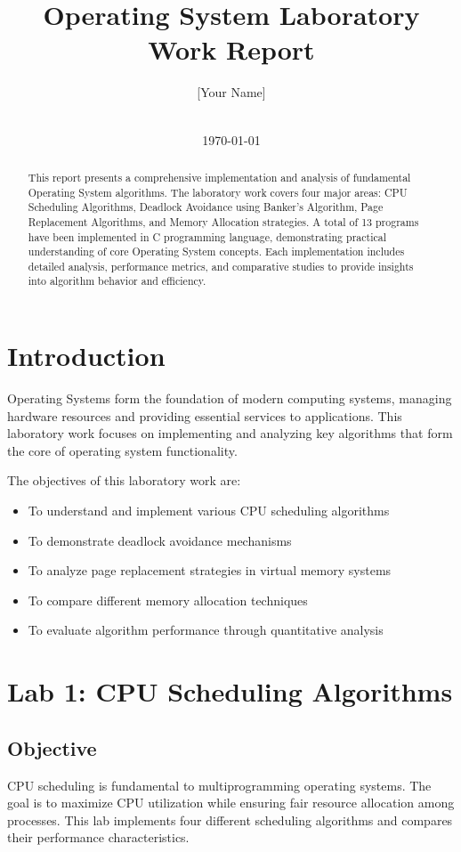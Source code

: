 \documentclass[12pt,a4paper]{article}
\title{\textbf{Operating System Laboratory Work Report}}
\author{[Your Name] \\ [Your Roll Number] \\ [Your Department]}
\date{\today}
\begin{document}
\maketitle

\begin{abstract}
This report presents a comprehensive implementation and analysis of fundamental Operating System algorithms. The laboratory work covers four major areas: CPU Scheduling Algorithms, Deadlock Avoidance using Banker's Algorithm, Page Replacement Algorithms, and Memory Allocation strategies. A total of 13 programs have been implemented in C programming language, demonstrating practical understanding of core Operating System concepts. Each implementation includes detailed analysis, performance metrics, and comparative studies to provide insights into algorithm behavior and efficiency.
\end{abstract}

\newpage
\tableofcontents
\newpage

\section{Introduction}

Operating Systems form the foundation of modern computing systems, managing hardware resources and providing essential services to applications. This laboratory work focuses on implementing and analyzing key algorithms that form the core of operating system functionality.

The objectives of this laboratory work are:
\begin{itemize}
    \item To understand and implement various CPU scheduling algorithms
    \item To demonstrate deadlock avoidance mechanisms
    \item To analyze page replacement strategies in virtual memory systems
    \item To compare different memory allocation techniques
    \item To evaluate algorithm performance through quantitative analysis
\end{itemize}

\section{Lab 1: CPU Scheduling Algorithms}

\subsection{Objective}
CPU scheduling is fundamental to multiprogramming operating systems. The goal is to maximize CPU utilization while ensuring fair resource allocation among processes. This lab implements four different scheduling algorithms and compares their performance characteristics.
\end{document}
